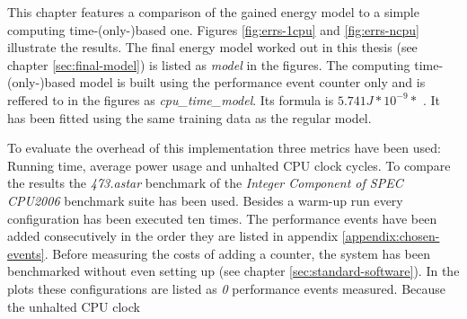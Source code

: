 This chapter features a comparison of the gained energy model to a simple
computing time-(only-)based one. Figures \ref{fig:errs-1cpu} and
\ref{fig:errs-ncpu} illustrate the results. The final energy model worked out in
this thesis (see chapter \ref{sec:final-model}) is listed as \emph{model} in the
figures. The computing time-(only-)based model is built using the performance
event counter  only and is reffered to in the
figures as \emph{cpu\_time\_model}. Its formula is $5.741J * 10^{-9} *$
. It has been fitted using the same training data as
the regular model.

\label{sec:overhead}

To evaluate the overhead of this implementation three metrics have been used:
Running time, average power usage and unhalted CPU clock cycles. To compare the
results the \emph{473.astar} benchmark of the \emph{Integer Component of SPEC
CPU2006} benchmark suite has been used. Besides a warm-up run every
configuration has been executed ten times. The performance events have been
added consecutively in the order they are listed in appendix
\ref{appendix:chosen-events}. Before measuring the costs of adding a counter,
the system has been benchmarked without even setting up \JWTlibpfm{} (see
chapter \ref{sec:standard-software}). In the plots these configurations are
listed as \emph{0} performance events measured. Because the unhalted CPU clock
